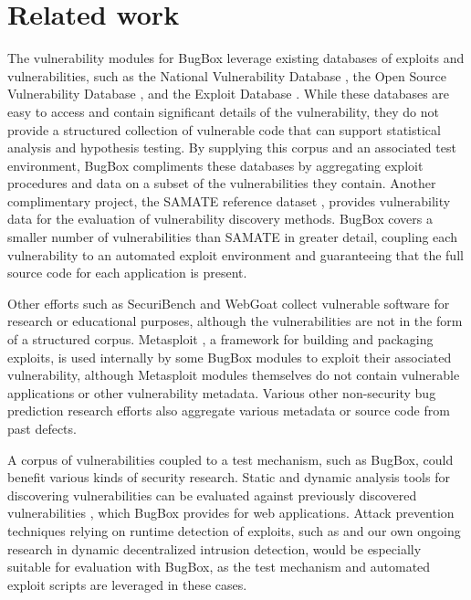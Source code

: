 \documentclass[letterpaper,twocolumn,10pt]{article}
\begin{document}
\section{Related work}
The vulnerability modules for BugBox leverage existing databases of exploits and vulnerabilities, such as the National Vulnerability Database \cite{NVD}, the Open Source Vulnerability Database \cite{OSVDB}, and the Exploit Database \cite{exploitdb}. While these databases are easy to access and contain significant details of the vulnerability, they do not provide a structured collection of vulnerable code that can support statistical analysis and hypothesis testing. By supplying this corpus and an associated test environment, BugBox compliments these databases by aggregating exploit procedures and data on a subset of the vulnerabilities they contain. Another complimentary project, the SAMATE reference dataset \cite{SAMATE}, provides vulnerability data for the evaluation of vulnerability discovery methods. BugBox covers a smaller number of vulnerabilities than SAMATE in greater detail, coupling each vulnerability to an automated exploit environment and guaranteeing that the full source code for each application is present.

Other efforts such as SecuriBench \cite{livshits2005defining} and WebGoat \cite{webgoat} collect vulnerable software for research or educational purposes, although the vulnerabilities are not in the form of a structured corpus. Metasploit \cite{metasploit}, a framework for building and packaging exploits, is used internally by some BugBox modules to exploit their associated vulnerability, although Metasploit modules themselves do not contain vulnerable applications or other vulnerability metadata. Various other non-security bug prediction research efforts \cite{defectcorpus,predictingdefectseclipse} also aggregate various metadata or source code from past defects.

A corpus of vulnerabilities coupled to a test mechanism, such as BugBox, could benefit various kinds of security research. Static and dynamic analysis tools for discovering vulnerabilities \cite{onetechnique,antunes2009comparing} can be evaluated against previously discovered vulnerabilities \cite{bufferoverflowbenchmark}, which BugBox provides for web applications. Attack prevention techniques relying on runtime detection of exploits, such as \cite{commandinjection} and our own ongoing research in dynamic decentralized intrusion detection, would be especially suitable for evaluation with BugBox, as the test mechanism and automated exploit scripts are leveraged in these cases.
\end{document}
